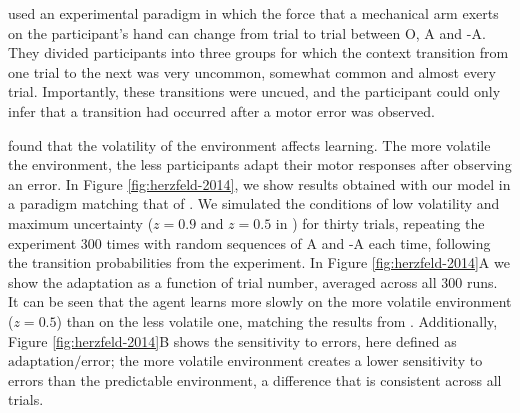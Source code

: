 \documentclass[a4paper,doc,floatsintext,natbib]{apa6}
\def \fref #1{Figure \ref{#1}}     %
\begin{document}
\cite{Herzfeld_memory_2014} used an experimental paradigm in which the force that a mechanical arm exerts on the participant's hand can change from trial to trial between O, A and -A. They divided participants into three groups for which the context transition from one trial to the next was very uncommon, somewhat common and almost every trial. Importantly, these transitions were uncued, and the participant could only infer that a transition had occurred after a motor error was observed.

\cite{Herzfeld_memory_2014} found that the volatility of the environment affects learning. The more volatile the environment, the less participants adapt their motor responses after observing an error. In \fref{fig:herzfeld-2014}, we show results obtained with our model in a paradigm matching that of \cite{Herzfeld_memory_2014}. We simulated the conditions of low volatility and maximum uncertainty ($z = 0.9$ and $z = 0.5$ in \cite{Herzfeld_memory_2014}) for thirty trials, repeating the experiment 300 times with random sequences of A and -A each time, following the transition probabilities from the experiment. In \fref{fig:herzfeld-2014}A we show the adaptation as a function of trial number, averaged across all 300 runs. It can be seen that the agent learns more slowly on the more volatile environment ($z = 0.5$) than on the less volatile one, matching the results from \cite{Herzfeld_memory_2014}. Additionally, \fref{fig:herzfeld-2014}B shows the sensitivity to errors, here defined as $\text{adaptation} / \text{error}$; the more volatile environment creates a lower sensitivity to errors than the predictable environment, a difference that is consistent across all trials.
\end{document}

